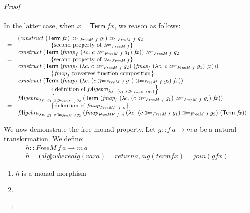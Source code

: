 \documentclass{jfp1}
\newcommand{\fold}[1]{\llparenthesis #1 \rrparenthesis}
\newcommand{\mbind}{\mathrel{>\kern-0.45em>\kern-0.45em=}}
\newcommand{\eqAnnotation}[1]{\hspace{2cm}\left\{\textrm{#1}\right\}}
\begin{document}
\begin{proof}
\begin{enumerate}
\begin{displaymath}
\begin{array}{cl}
      \end{array}
    \end{displaymath}
    In the latter case, when $x = \mathsf{Term}~\mathit{fx}$, we
    reason as follows:
    \begin{displaymath}
      \begin{array}{cl}
        & (\mathit{construct}~(\mathsf{Term}~\mathit{fx}) \mbind_{\mathit{FreeM}~f} g_1) \mbind_{\mathit{FreeM}~f} g_2\\
        =&\eqAnnotation{second property of $\mbind_{\mathit{FreeM}~f}$} \\
        & \mathit{construct}~(\mathsf{Term}~(\mathit{fmap}_f~(\lambda c.~c \mbind_{\mathit{FreeM}~f} g_1)~\mathit{fx})) \mbind_{\mathit{FreeM}~f} g_2 \\
        =&\eqAnnotation{second property of $\mbind_{\mathit{FreeM}~f}$} \\
        & \mathit{construct}~(\mathsf{Term}~(\mathit{fmap_f}~(\lambda c.~c \mbind_{\mathit{FreeM}~f} g_2)~(\mathit{fmap_f}~(\lambda c.~c \mbind_{\mathit{FreeM}~f} g_1)~\mathit{fx}))) \\
        =&\eqAnnotation{$\mathit{fmap}_f$ preserves function composition} \\
        & \mathit{construct}~(\mathsf{Term}~(\mathit{fmap_f}~(\lambda c.~(c \mbind_{\mathit{FreeM}~f} g_1) \mbind_{\mathit{FreeM}~f} g_2)~\mathit{fx})) \\
        =&\eqAnnotation{definition of $\mathit{fAlgebra}_{\lambda x.~(g_1~x \mbind_{\mathit{FreeM}~f} g_1)}$} \\
        & \mathit{fAlgebra}_{\lambda x.~g_1~x \mbind_{\mathit{FreeM}~f} g_2}~(\mathsf{Term}~(\mathit{fmap_f}~(\lambda c.~(c \mbind_{\mathit{FreeM}~f} g_1) \mbind_{\mathit{FreeM}~f} g_2)~\mathit{fx})) \\
        =&\eqAnnotation{definition of $\mathit{fmap}_{\mathit{FreeMF}~f~a}$} \\
        & \mathit{fAlgebra}_{\lambda x.~g_1~x \mbind_{\mathit{FreeM}~f} g_2}~(\mathit{fmap}_{\mathit{FreeMF}~f~a}~(\lambda c.~(c \mbind_{\mathit{FreeM}~f} g_1) \mbind_{\mathit{FreeM}~f} g_2)~(\mathsf{Term}~\mathit{fx}))
      \end{array}
    \end{displaymath}
  \end{enumerate}
  We now demonstrate the free monad property. Let $g :: f~a \to m~a$
  be a natural transformation. We define:
  \begin{displaymath}
    \begin{array}{l}
      h :: \mathit{FreeM}~f~a \to m~a \\
      h = \fold{alg} where alg (var a) = return a, alg (term fx) = join (g fx)
    \end{array}
  \end{displaymath}

  \begin{enumerate}
  \item $h$ is a monad morphism
  \item 
  \end{enumerate}
\end{proof}
\end{document}
